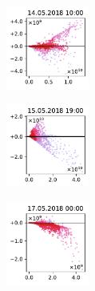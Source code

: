 \begin{figure}[H]
    \centering
    \begin{subfigure}
        \centering
        \includegraphics[width=0.30\textwidth,valign=t]{evaluation/figures/perturbations/perturbation-14.05.2018:10.00-monoterpenes-div-1.5.pdf}
    \end{subfigure}
    \begin{subfigure}
        \centering
        \includegraphics[width=0.30\textwidth,valign=t]{evaluation/figures/perturbations/perturbation-15.05.2018:19.00-monoterpenes-div-1.5.pdf}
    \end{subfigure}
    \begin{subfigure}
        \centering
        \includegraphics[width=0.30\textwidth,valign=t]{evaluation/figures/perturbations/perturbation-17.05.2018:00.00-monoterpenes-div-1.5.pdf}
    \end{subfigure}


\end{figure}
